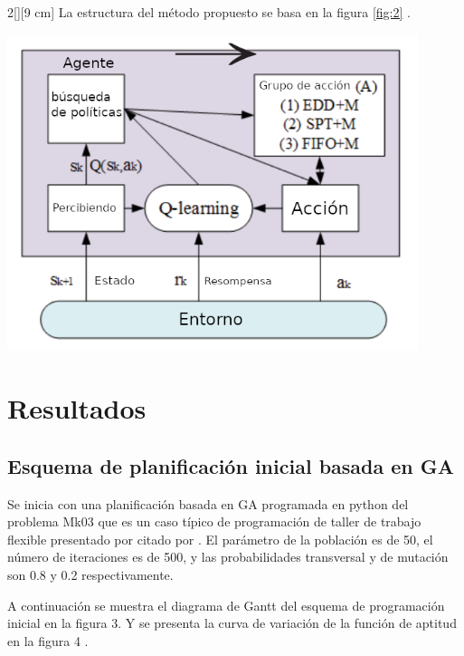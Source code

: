 \documentclass[letterpaper, 10 pt]{article}
\newenvironment{Figura}
{\par\medskip\noindent\minipage{\linewidth}}
{\endminipage\par\medskip}
\begin{document}
\begin{multicols}{2}[][9 cm]
La estructura del método propuesto se basa en la figura \ref{fig:2} \citep{zhao2019improved}.
\begin{Figura}
	\centering
	\includegraphics[width=0.9\textwidth]{estructura.png}
	\label{fig:2}
\end{Figura}  
\section{Resultados}
\subsection{Esquema de planificación inicial basada en GA }
 Se inicia con una planificación basada en GA programada en python del problema Mk03 que es un caso típico de programación de taller de trabajo flexible presentado por \cite{brandimarte1993routing} citado por \cite{zhao2019improved}. El parámetro de la población es de 50, el número de iteraciones es de 500, y las probabilidades transversal y de mutación son 0.8 y 0.2 respectivamente.

A continuación se muestra el diagrama de Gantt del esquema de programación inicial
en la figura 3. Y se presenta la curva de variación de la función de aptitud en la figura 4 \citep{zhao2019improved}.


\end{multicols}
\end{document}
